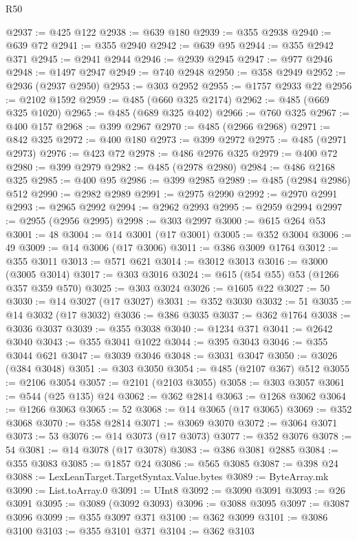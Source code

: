 \begin{lexlean}{R50}
\begin{coremodule}
@2937 := @425 @122
@2938 := @639 @180
@2939 := @355 @2938
@2940 := @639 @72
@2941 := @355 @2940
@2942 := @639 @95
@2944 := @355 @2942 @371
@2945 := @2941 @2944
@2946 := @2939 @2945
@2947 := @977 @2946
@2948 := @1497 @2947
@2949 := @740 @2948
@2950 := @358 @2949
@2952 := @2936 (@2937 @2950)
@2953 := @303 @2952
@2955 := @1757 @2933 @22
@2956 := @2102 @1592
@2959 := @485 (@660 @325 @2174)
@2962 := @485 (@669 @325 @1020)
@2965 := @485 (@689 @325 @402)
@2966 := @760 @325
@2967 := @400 @157
@2968 := @399 @2967
@2970 := @485 (@2966 @2968)
@2971 := @842 @325
@2972 := @400 @180
@2973 := @399 @2972
@2975 := @485 (@2971 @2973)
@2976 := @423 @72
@2978 := @486 @2976 @325
@2979 := @400 @72
@2980 := @399 @2979
@2982 := @485 (@2978 @2980)
@2984 := @486 @2168 @325
@2985 := @400 @95
@2986 := @399 @2985
@2989 := @485 (@2984 @2986) @512
@2990 := @2982 @2989
@2991 := @2975 @2990
@2992 := @2970 @2991
@2993 := @2965 @2992
@2994 := @2962 @2993
@2995 := @2959 @2994
@2997 := @2955 (@2956 @2995)
@2998 := @303 @2997
@3000 := @615 @264 @53
@3001 := 48
@3004 := @14 @3001 (@17 @3001)
@3005 := @352 @3004
@3006 := 49
@3009 := @14 @3006 (@17 @3006)
@3011 := @386 @3009 @1764
@3012 := @355 @3011
@3013 := @571 @621
@3014 := @3012 @3013
@3016 := @3000 (@3005 @3014)
@3017 := @303 @3016
@3024 := @615 (@54 @55) @53 (@1266 @357 @359 @570)
@3025 := @303 @3024
@3026 := @1605 @22
@3027 := 50
@3030 := @14 @3027 (@17 @3027)
@3031 := @352 @3030
@3032 := 51
@3035 := @14 @3032 (@17 @3032)
@3036 := @386 @3035
@3037 := @362 @1764
@3038 := @3036 @3037
@3039 := @355 @3038
@3040 := @1234 @371
@3041 := @2642 @3040
@3043 := @355 @3041 @1022
@3044 := @395 @3043
@3046 := @355 @3044 @621
@3047 := @3039 @3046
@3048 := @3031 @3047
@3050 := @3026 (@384 @3048)
@3051 := @303 @3050
@3054 := @485 (@2107 @367) @512
@3055 := @2106 @3054
@3057 := @2101 (@2103 @3055)
@3058 := @303 @3057
@3061 := @544 (@25 @135) @24
@3062 := @362 @2814
@3063 := @1268 @3062
@3064 := @1266 @3063
@3065 := 52
@3068 := @14 @3065 (@17 @3065)
@3069 := @352 @3068
@3070 := @358 @2814
@3071 := @3069 @3070
@3072 := @3064 @3071
@3073 := 53
@3076 := @14 @3073 (@17 @3073)
@3077 := @352 @3076
@3078 := 54
@3081 := @14 @3078 (@17 @3078)
@3083 := @386 @3081 @2885
@3084 := @355 @3083
@3085 := @1857 @24
@3086 := @565 @3085
@3087 := @398 @24
@3088 := LexLeanTarget.TargetSyntax.Value.bytes
@3089 := ByteArray.mk
@3090 := List.toArray.{0}
@3091 := UInt8
@3092 := @3090 @3091
@3093 := @26 @3091
@3095 := @3089 (@3092 @3093)
@3096 := @3088 @3095
@3097 := @3087 @3096
@3099 := @355 @3097 @371
@3100 := @362 @3099
@3101 := @3086 @3100
@3103 := @355 @3101 @371
@3104 := @362 @3103

\end{coremodule}
\end{lexlean}
